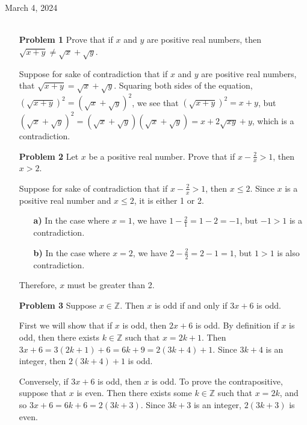 \documentclass[12pt, oneside]{article}
\newcommand{\Integers}{\mathbb{Z}}
\begin{document}
\begin{flushleft}
\end{flushleft}
March 4, 2024\\\\
\begin{itemize}
    \item[\textbf{Problem 1}] Prove that if \(x\) and \(y\) are positive real numbers, then \(\sqrt{x+y} \neq \sqrt{x} + \sqrt{y}\).

          Suppose for sake of contradiction that if \(x\) and \(y\) are positive real numbers, that \(\sqrt{x+y} = \sqrt{x} + \sqrt{y}\). Squaring both sides of the equation, \((\sqrt{x+y})^2 = (\sqrt{x} + \sqrt{y})^2\), we see that \((\sqrt{x+y})^2 = x + y\), but
          \((\sqrt{x} + \sqrt{y})^2 =(\sqrt{x} + \sqrt{y})(\sqrt{x} + \sqrt{y})= x + 2\sqrt{xy} + y\), which is a contradiction.
    \item[\textbf{Problem 2}] Let \(x\)  be a positive real number. Prove that if \(x - \frac{2}{x} > 1\), then \(x > 2\).

          Suppose for sake of contradiction that if \(x - \frac{2}{x} > 1\), then \(x \leq 2\). Since \(x\) is a positive real number and \(x \leq 2\), it is either 1 or 2.

          \begin{itemize}
              \item[\textbf{a)}] In the case where \(x = 1\), we have \( 1 - \frac{2}{1} = 1 - 2 = -1\), but \(-1 > 1\) is a contradiction.

              \item[\textbf{b)}] In the case where \(x = 2\), we have \(2 - \frac{2}{2} = 2 - 1 = 1\), but \(1 > 1\) is also contradiction.
          \end{itemize}
          Therefore, \(x\) must be greater than 2.

    \item[\textbf{Problem 3}] Suppose \(x \in \Integers\). Then \(x\) is odd if and only if \(3x +6\) is odd.

          First we will show that if \(x\) is odd, then \(2x +6\) is odd. By definition if \(x\) is odd, then there exists \(k \in \Integers\) such that \(x = 2k + 1\). Then \(3x + 6 = 3(2k+1) + 6 = 6k + 9 = 2(3k + 4) + 1\). Since \(3k +4\) is an integer, then \(2(3k + 4) + 1\) is odd.

          Conversely, if  \(3x +6\) is odd, then \(x\) is odd. To prove the contrapositive, suppose that \(x\) is even. Then there exists some \(k \in \Integers\) such that \(x = 2k\), and so \(3x + 6 = 6k + 6 = 2(3k+3)\). Since \(3k+3\) is an integer, \(2(3k+3)\) is even.



\end{itemize}
\end{document}
